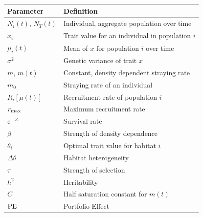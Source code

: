 \documentclass{revtex4}
\begin{document}
\begin{center}
\begin{tabular}{ l|l }
\hline
Parameter & Definition \\
\hline
$N_i(t)$, $N_T(t)$ & Individual, aggregate population over time\\
$x_i$ & Trait value for an individual in population $i$\\
$\mu_i(t)$ & Mean of $x$ for population $i$ over time\\
$\sigma^2$ & Genetic variance of trait $x$\\
$m$, $m(t)$ & Constant, density dependent straying rate\\
$m_0$ & Straying rate of an individual\\
$R_i[\mu(t)]$ & Recruitment rate of population $i$\\
$r_{\rm max}$ & Maximum recruitment rate\\
${\rm e}^{-Z}$ & Survival rate\\
$\beta$ & Strength of density dependence\\
$\theta_i$ & Optimal trait value for habitat $i$\\
$\Delta\theta$ & Habitat heterogeneity\\
$\tau$ & Strength of selection\\
$h^2$ & Heritability\\
$C$ & Half saturation constant for $m(t)$\\
${\rm PE}$ & Portfolio Effect\\
\hline
\end{tabular}
\end{center}


\clearpage
\end{document}
